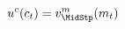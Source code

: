   \begin{equation}\begin{gathered}\begin{aligned}
        \uFunc^{{c}}({c}_{\prd})  & = {\vFunc}^{{m}}_{\MidStp}({m}_{\prd})\label{eq:upcteqvtp}
      \end{aligned}\end{gathered}\end{equation}
